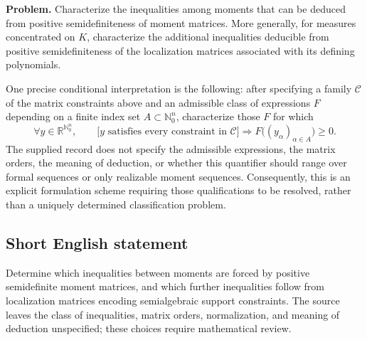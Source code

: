 \documentclass[11pt]{article}
\newcommand{\N}{\mathbb{N}}
\newcommand{\R}{\mathbb{R}}
\begin{document}
\textbf{Problem.} Characterize the inequalities among moments that can be deduced from positive semidefiniteness of moment matrices. More generally, for measures concentrated on \(K\), characterize the additional inequalities deducible from positive semidefiniteness of the localization matrices associated with its defining polynomials.

One precise conditional interpretation is the following: after specifying a family \(\mathcal C\) of the matrix constraints above and an admissible class of expressions \(F\) depending on a finite index set \(A\subset\N_0^n\), characterize those \(F\) for which
\[
\forall y\in\R^{\N_0^n},\qquad
\bigl[y\text{ satisfies every constraint in }\mathcal C\bigr]
\Longrightarrow F\bigl((y_\alpha)_{\alpha\in A}\bigr)\geq0.
\]
The supplied record does not specify the admissible expressions, the matrix orders, the meaning of deduction, or whether this quantifier should range over formal sequences or only realizable moment sequences. Consequently, this is an explicit formulation scheme requiring those qualifications to be resolved, rather than a uniquely determined classification problem.
\subsection{Short English statement}
Determine which inequalities between moments are forced by positive semidefinite moment matrices, and which further inequalities follow from localization matrices encoding semialgebraic support constraints. The source leaves the class of inequalities, matrix orders, normalization, and meaning of deduction unspecified; these choices require mathematical review.
\end{document}
